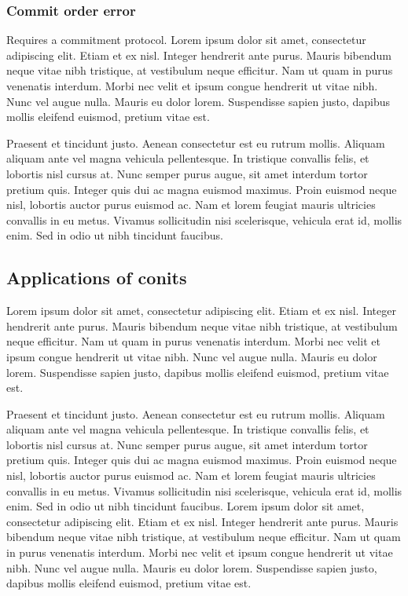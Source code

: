 \subsubsection*{Commit order error}

Requires a commitment protocol. Lorem ipsum dolor sit amet,
consectetur adipiscing elit. Etiam et ex nisl. Integer hendrerit ante
purus. Mauris bibendum neque vitae nibh tristique, at vestibulum neque
efficitur. Nam ut quam in purus venenatis interdum. Morbi nec velit et
ipsum congue hendrerit ut vitae nibh. Nunc vel augue nulla. Mauris eu
dolor lorem. Suspendisse sapien justo, dapibus mollis eleifend
euismod, pretium vitae est.

Praesent et tincidunt justo. Aenean consectetur est eu rutrum
mollis. Aliquam aliquam ante vel magna vehicula pellentesque. In
tristique convallis felis, et lobortis nisl cursus at. Nunc semper
purus augue, sit amet interdum tortor pretium quis. Integer quis dui
ac magna euismod maximus. Proin euismod neque nisl, lobortis auctor
purus euismod ac. Nam et lorem feugiat mauris ultricies convallis in
eu metus. Vivamus sollicitudin nisi scelerisque, vehicula erat id,
mollis enim. Sed in odio ut nibh tincidunt faucibus.

\subsection{Applications of conits}

Lorem ipsum dolor sit amet, consectetur adipiscing elit. Etiam et ex
nisl. Integer hendrerit ante purus. Mauris bibendum neque vitae nibh
tristique, at vestibulum neque efficitur. Nam ut quam in purus
venenatis interdum. Morbi nec velit et ipsum congue hendrerit ut vitae
nibh. Nunc vel augue nulla. Mauris eu dolor lorem. Suspendisse sapien
justo, dapibus mollis eleifend euismod, pretium vitae est.

Praesent et tincidunt justo. Aenean consectetur est eu rutrum
mollis. Aliquam aliquam ante vel magna vehicula pellentesque. In
tristique convallis felis, et lobortis nisl cursus at. Nunc semper
purus augue, sit amet interdum tortor pretium quis. Integer quis dui
ac magna euismod maximus. Proin euismod neque nisl, lobortis auctor
purus euismod ac. Nam et lorem feugiat mauris ultricies convallis in
eu metus. Vivamus sollicitudin nisi scelerisque, vehicula erat id,
mollis enim. Sed in odio ut nibh tincidunt faucibus.  Lorem ipsum
dolor sit amet, consectetur adipiscing elit. Etiam et ex nisl. Integer
hendrerit ante purus. Mauris bibendum neque vitae nibh tristique, at
vestibulum neque efficitur. Nam ut quam in purus venenatis
interdum. Morbi nec velit et ipsum congue hendrerit ut vitae
nibh. Nunc vel augue nulla. Mauris eu dolor lorem. Suspendisse sapien
justo, dapibus mollis eleifend euismod, pretium vitae est.

